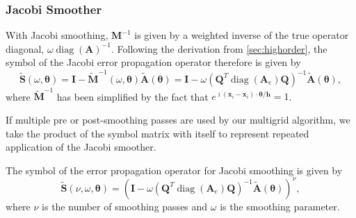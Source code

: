 \documentclass[review]{siamart190516}
\DeclareMathOperator{\diag}{diag}
\begin{document}
\subsubsection{Jacobi Smoother}\label{sec:jacobi}

With Jacobi smoothing, $\mathbf{M}^{-1}$ is given by a weighted inverse of the true operator diagonal, $\omega \diag \left( \mathbf{A} \right)^{-1}$.
Following the derivation from \cref{sec:highorder}, the symbol of the Jacobi error propagation operator therefore is given by
\begin{equation}
\tilde{\mathbf{S}} \left( \omega, \boldsymbol{\theta} \right) = \mathbf{I} - \tilde{\mathbf{M}}^{-1} \left( \omega, \boldsymbol{\theta} \right) \tilde{\mathbf{A}} \left( \boldsymbol{\theta} \right) = \mathbf{I} - \omega \left( \mathbf{Q}^T \diag \left( \mathbf{A}_e \right) \mathbf{Q} \right)^{-1} \tilde{\mathbf{A}} \left( \boldsymbol{\theta} \right),
\end{equation}
where $\tilde{\mathbf{M}}^{-1}$ has been simplified by the fact that $e^{\imath \left( \mathbf{x}_i - \mathbf{x}_i \right) \cdot \boldsymbol{\theta} / \mathbf{h}} = 1$.

If multiple pre or post-smoothing passes are used by our multigrid algorithm, we take the product of the symbol matrix with itself to represent repeated application of the Jacobi smoother.

\begin{definition}\label{def:jacobi_symbol}
The symbol of the error propagation operator for Jacobi smoothing is given by
\begin{equation}
\tilde{\mathbf{S}} \left( \nu, \omega, \boldsymbol{\theta} \right) = \left( \mathbf{I} - \omega \left( \mathbf{Q}^T \diag \left( \mathbf{A}_e \right) \mathbf{Q} \right)^{-1} \tilde{\mathbf{A}} \left( \boldsymbol{\theta} \right) \right)^\nu,
\end{equation}
where $\nu$ is the number of smoothing passes and $\omega$ is the smoothing parameter.
\end{definition}
\end{document}
